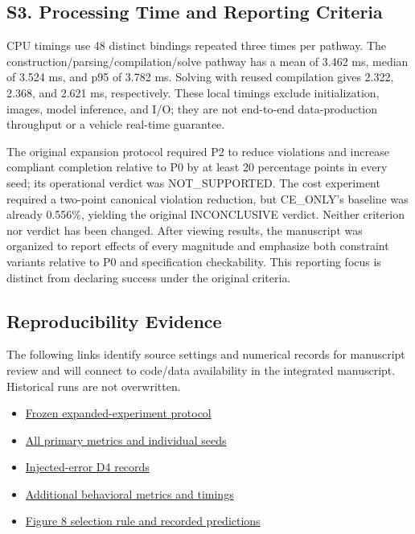 \documentclass[11pt,a4paper]{article}
\begin{document}
\subsection*{S3. Processing Time and Reporting Criteria}

CPU timings use 48 distinct bindings repeated three times per pathway. The construction/parsing/compilation/solve pathway has a mean of 3.462 ms, median of 3.524 ms, and p95 of 3.782 ms. Solving with reused compilation gives 2.322, 2.368, and 2.621 ms, respectively. These local timings exclude initialization, images, model inference, and I/O; they are not end-to-end data-production throughput or a vehicle real-time guarantee.\par

The original expansion protocol required P2 to reduce violations and increase compliant completion relative to P0 by at least 20 percentage points in every seed; its operational verdict was NOT\_SUPPORTED. The cost experiment required a two-point canonical violation reduction, but CE\_ONLY's baseline was already 0.556\%, yielding the original INCONCLUSIVE verdict. Neither criterion nor verdict has been changed. After viewing results, the manuscript was organized to report effects of every magnitude and emphasize both constraint variants relative to P0 and specification checkability. This reporting focus is distinct from declaring success under the original criteria.\par

\begingroup\small\setlength{\parskip}{3pt}
\subsection*{Reproducibility Evidence}

The following links identify source settings and numerical records for manuscript review and will connect to code/data availability in the integrated manuscript. Historical runs are not overwritten.\par

\begin{itemize}\setlength{\itemsep}{0pt}\setlength{\parsep}{0pt}\setlength{\topsep}{2pt}
\item \href{\detokenize{../temporal-expansion-protocol-2026-09-29-001/protocol.json}}{Frozen expanded-experiment protocol}
\item \href{\detokenize{../temporal-experiment-closure-2026-09-29-001/all_primary_metrics.csv}}{All primary metrics and individual seeds}
\item \href{\detokenize{../../paper1-temporal-diversity-001/diversity-analysis-2026-09-29-001/RESULT.json}}{Injected-error D4 records}
\item \href{\detokenize{../temporal-secondary-metrics-2026-09-29-001/RESULT.json}}{Additional behavioral metrics and timings}
\item \href{\detokenize{selected_cases.json}}{Figure 8 selection rule and recorded predictions}
\end{itemize}
\endgroup
\end{document}
